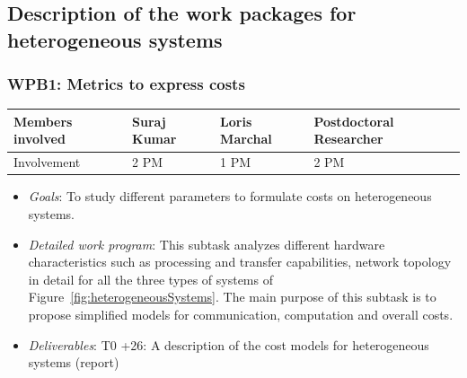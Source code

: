 \documentclass[a4paper,11pt]{article}
\newcommand{\subtask}[1]{{\color{orange}\paragraph{#1}$ $}}
\newcommand{\goal}{{\color{orange2}  \emph{Goals}:} }
\newcommand{\dwp}{{\color{orange2}  \emph{Detailed work program}: }}
\newcommand{\deliverables}{{\color{orange2}  \emph{Deliverables}: }}
\begin{document}
	
	\subsection{Description of the work packages for heterogeneous systems}
	\label{sec:org:wp:hetero}	
	\subsubsection{\textbf{WPB1}: Metrics to express costs}
	\vspace*{-0.385cm}\begin{table}[H]
		\begin{tabular}{llll}
			\hline
			\cellcolor{blue2}
			Members involved & Suraj Kumar& Loris Marchal & Postdoctoral Researcher \\
			\hline
			\cellcolor{orange2}
			Involvement      & 2 PM            & 1 PM & 2 PM \\
			\hline
		\end{tabular}
	\end{table}\vspace*{-0.25cm}
\newpage
	\begin{itemize}[leftmargin=-1pt]
		\item[] \goal To study different parameters to formulate costs on heterogeneous systems.
		\item[] \dwp This subtask analyzes different hardware characteristics such as processing and transfer capabilities, network topology in detail for all the three types of systems of Figure~\ref{fig:heterogeneousSystems}. The main purpose of this subtask is to propose simplified models for communication, computation and overall costs. 
		\item[] \deliverables T0 +26: A description of the cost models for heterogeneous systems (report) 
	\end{itemize}
	
\end{document}
